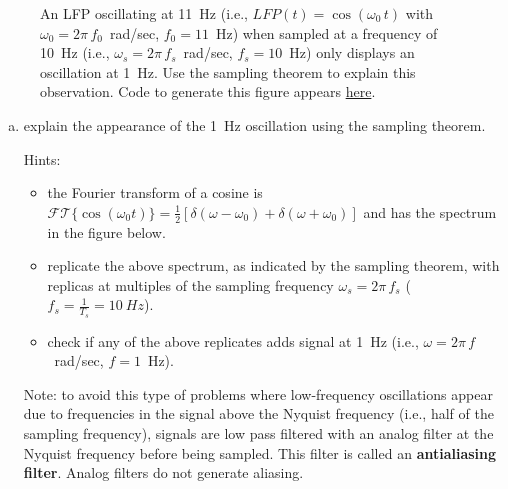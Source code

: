 \documentclass[12pt]{article}
\begin{document}
\begin{enumerate}
\begin{figure}
\begin{center}
                \caption{An LFP oscillating at 11~Hz (i.e., $LFP(t)=\cos(\omega_0\,t)$ with $\omega_0=2\pi\,f_0$~rad/sec,
                $f_0=11$~Hz) when sampled at a frequency of 10~Hz (i.e.,
                $\omega_s=2\pi\,f_s$~rad/sec, $f_s=10$~Hz) only displays an
                oscillation at 1~Hz. Use the sampling theorem to explain this
                observation.  Code to generate this figure appears
                \href{https://github.com/joacorapela/neuroinformatics24/blob/master/worksheets/02_LFPs_spectralAnalysis/code/doExUndersampledLFP.py}{here}.}

            \end{center}
            \label{fig:undersampledLFP}
        \end{figure}

        \begin{enumerate}[(a)]

            \item explain the appearance of the 1~Hz oscillation using the
                sampling theorem.

                Hints:

                \begin{itemize}

                    \item the Fourier transform of a cosine is
                        $\mathcal{FT}\{\cos(\omega_0 t)\}=\frac{1}{2}[\delta(\omega-\omega_0)+\delta(\omega+\omega_0)]$
                        and has the spectrum in the figure below.
                        

                    \item replicate the above spectrum, as indicated
                        by the sampling theorem, with replicas at multiples
                        of the sampling frequency $\omega_s=2\pi\,f_s$
                        ($f_s=\frac{1}{T_s}=10~Hz$).

                    \item check if any of the above replicates adds signal at
                        1~Hz (i.e., $\omega=2\pi\,f$~rad/sec, $f=1$~Hz).
                \end{itemize}

                Note: to avoid this type of problems where low-frequency
                oscillations appear due to frequencies in the signal above the
                Nyquist frequency (i.e., half of the sampling frequency),
                signals are low pass filtered with an analog filter at the
                Nyquist frequency before being sampled. This filter is called
                an \textbf{antialiasing filter}. Analog filters do not
                generate aliasing.


\end{enumerate}
\end{enumerate}
\end{document}
